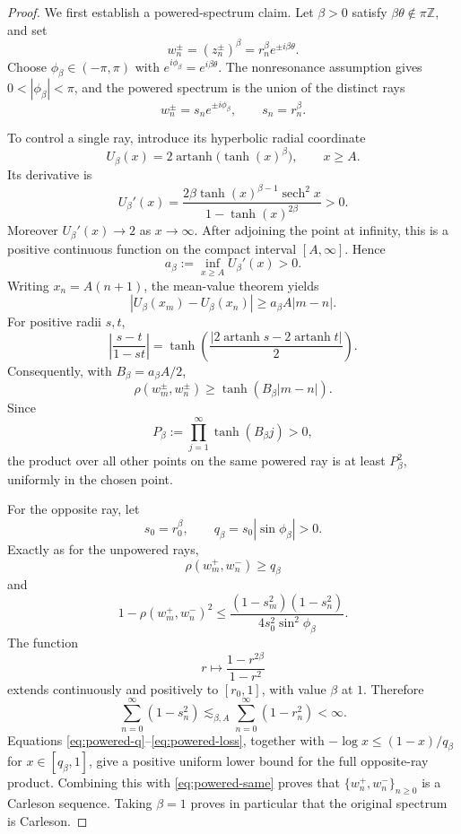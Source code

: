 \documentclass[11pt]{article}
\theoremstyle{definition}
\newcommand{\rhoh}{\rho}
\begin{document}
\begin{proof}
We first establish a powered-spectrum claim.  Let \(\beta>0\) satisfy
\(\beta\theta\notin\pi\mathbb Z\), and set
\[
 w_n^\pm=(z_n^\pm)^\beta
 =r_n^\beta e^{\pm i\beta\theta}.
\]
Choose \(\phi_\beta\in(-\pi,\pi)\) with
\(e^{i\phi_\beta}=e^{i\beta\theta}\).  The nonresonance assumption gives
\(0<|\phi_\beta|<\pi\), and the powered spectrum is the union of the
distinct rays
\[
 w_n^\pm=s_ne^{\pm i\phi_\beta},
 \qquad s_n=r_n^\beta.
\]

To control a single ray, introduce its hyperbolic radial coordinate
\[
 U_\beta(x)
 =2\operatorname{artanh}\bigl(\tanh(x)^\beta\bigr),
 \qquad x\ge A.
\]
Its derivative is
\[
 U_\beta'(x)
 =\frac{2\beta\tanh(x)^{\beta-1}\operatorname{sech}^2x}
 {1-\tanh(x)^{2\beta}}>0.
\]
Moreover \(U_\beta'(x)\to2\) as \(x\to\infty\).  After adjoining the
point at infinity, this is a positive continuous function on the compact
interval \([A,\infty]\).  Hence
\[
 a_\beta:=\inf_{x\ge A}U_\beta'(x)>0.
\]
Writing \(x_n=A(n+1)\), the mean-value theorem yields
\[
 |U_\beta(x_m)-U_\beta(x_n)|
 \ge a_\beta A|m-n|.
\]
For positive radii \(s,t\),
\[
 \left|\frac{s-t}{1-st}\right|
 =\tanh\left(
 \frac{|2\operatorname{artanh}s-2\operatorname{artanh}t|}{2}
 \right).
\]
Consequently, with \(B_\beta=a_\beta A/2\),
\begin{equation}\label{eq:powered-same}
 \rhoh(w_m^\pm,w_n^\pm)
 \ge\tanh(B_\beta|m-n|).
\end{equation}
Since
\[
 P_\beta:=\prod_{j=1}^{\infty}\tanh(B_\beta j)>0,
\]
the product over all other points on the same powered ray is at least
\(P_\beta^2\), uniformly in the chosen point.

For the opposite ray, let
\[
 s_0=r_0^\beta,\qquad
 q_\beta=s_0|\sin\phi_\beta|>0.
\]
Exactly as for the unpowered rays,
\begin{equation}\label{eq:powered-q}
 \rhoh(w_m^+,w_n^-)\ge q_\beta
\end{equation}
and
\begin{equation}\label{eq:powered-loss}
 1-\rhoh(w_m^+,w_n^-)^2
 \le
 \frac{(1-s_m^2)(1-s_n^2)}
 {4s_0^2\sin^2\phi_\beta}.
\end{equation}
The function
\[
 r\longmapsto\frac{1-r^{2\beta}}{1-r^2}
\]
extends continuously and positively to \([r_0,1]\), with value \(\beta\)
at \(1\).  Therefore
\[
 \sum_{n=0}^{\infty}(1-s_n^2)
 \lesssim_{\beta,A}
 \sum_{n=0}^{\infty}(1-r_n^2)<\infty.
\]
Equations \eqref{eq:powered-q}--\eqref{eq:powered-loss}, together with
\(-\log x\le(1-x)/q_\beta\) for \(x\in[q_\beta,1]\), give a positive
uniform lower bound for the full opposite-ray product.  Combining this
with \eqref{eq:powered-same} proves that
\(\{w_n^+,w_n^-\}_{n\ge0}\) is a Carleson sequence.  Taking
\(\beta=1\) proves in particular that the original spectrum is Carleson.


\end{proof}
\end{document}

